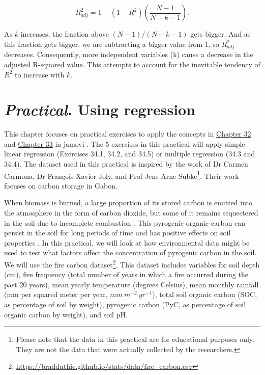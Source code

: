 \documentclass[
  openany]{krantz}
\begin{document}
\[R^{2}_{adj} = 1 - \left(1 - R^{2}\right)\left(\frac{N - 1}{N - k - 1}\right).\]

As \(k\) increases, the fraction above \((N-1)/(N-k-1)\) gets bigger.
And as this fraction gets bigger, we are subtracting a bigger value from 1, so \(R^{2}_{adj}\) decreases.
Consequently, more independent variables (k) cause a decrease in the adjusted R-squared value.
This attempts to account for the inevitable tendency of \(R^{2}\) to increase with \(k\).

\hypertarget{Chapter_34}{%
\chapter{\texorpdfstring{\emph{Practical}. Using regression}{Practical. Using regression}}\label{Chapter_34}}

This chapter focuses on practical exercises to apply the concepts in \protect\hyperlink{Chapter_32}{Chapter 32} and \protect\hyperlink{Chapter_33}{Chapter 33} in jamovi \citep{Jamovi2022}.
The 5 exercises in this practical will apply simple linear regression (Exercises 34.1, 34.2, and 34.5) or multiple regression (34.3 and 34.4).
The dataset used in this practical is inspired by the work of Dr Carmen Carmona, Dr François-Xavier Joly, and Prof Jens-Arne Subke\footnote{Please note that the data in this practical are for educational purposes only. They are not the data that were actually collected by the researchers.}.
Their work focuses on carbon storage in Gabon.

When biomass is burned, a large proportion of its stored carbon is emitted into the atmosphere in the form of carbon dioxide, but some of it remains sequestered in the soil due to incomplete combustion \citep{Santin2016}.
This pyrogenic organic carbon can persist in the soil for long periods of time and has positive effects on soil properties \citep{Reisser2016}.
In this practical, we will look at how environmental data might be used to test what factors affect the concentration of pyrogenic carbon in the soil.
We will use the fire carbon dataset\footnote{\url{https://bradduthie.github.io/stats/data/fire_carbon.csv}}.
This dataset includes variables for soil depth (cm), fire frequency (total number of years in which a fire occurred during the past 20 years), mean yearly temperature (degrees Celsius), mean monthly rainfall (mm per squared meter per year, \(mm\:m^{-2}\:yr^{-1}\)), total soil organic carbon (SOC, as percentage of soil by weight), pyrogenic carbon (PyC, as percentage of soil organic carbon by weight), and soil pH.
\end{document}
